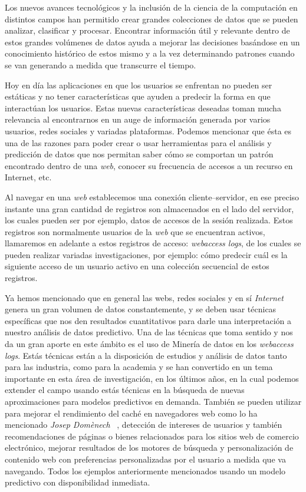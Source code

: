 {
Los nuevos avances tecnológicos y la inclusión de la ciencia de la computación en distintos campos han permitido crear grandes colecciones de datos que se pueden analizar, clasificar y procesar. Encontrar información útil y relevante dentro de estos grandes volúmenes de datos ayuda a mejorar las decisiones basándose en un conocimiento histórico de estos mismo y a la vez determinando patrones cuando se van generando a medida que transcurre el tiempo. 


Hoy en día las aplicaciones en que los usuarios se enfrentan no pueden ser estáticas y no tener características que ayuden a predecir la forma en que interactúan los usuarios. Estas nuevas características deseadas toman mucha relevancia al encontrarnos en un auge de información generada por varios usuarios, redes sociales y variadas plataformas. Podemos mencionar que ésta es una de las razones para poder  crear o usar  herramientas para el análisis y predicción de datos que nos permitan saber cómo se comportan un patrón encontrado dentro de una \emph{web}, conocer su frecuencia de accesos a un recurso en Internet, etc.

Al navegar en una \emph{web} establecemos una conexión {cliente--servidor}, en ese preciso instante una gran cantidad de registros son almacenados en el lado del servidor, los cuales pueden ser por ejemplo, datos de accesos de la sesión realizada. Estos registros  son normalmente usuarios de la \emph{web}  que se encuentran activos, llamaremos en adelante a estos registros de acceso: \emph{webaccess logs},  de los cuales se pueden realizar variadas investigaciones, por ejemplo:  cómo predecir cuál es la siguiente acceso de un usuario activo en una colección secuencial de estos registros. 

Ya hemos mencionado  que  en general las webs, redes sociales y en sí \emph{Internet} genera un gran volumen de datos constantemente, y se deben usar técnicas específicas que nos den resultados cuantitativos para darle una interpretación a nuestro análisis de datos predictivo. Una de las técnicas que toma sentido y nos da un gran aporte en este ámbito es el uso de Minería de datos  en los \emph{webaccess logs}.  Estás técnicas están a la disposición  de estudios y análisis de datos tanto para las industria, como para la academia y  se han convertido en un tema importante en esta área  de investigación, en los últimos años, en la cual podemos extender el campo usando estás técnicas en la búsqueda de nuevas aproximaciones para modelos predictivos en demanda. También se pueden utilizar para mejorar el rendimiento del caché en navegadores web como lo ha mencionado \emph{Josep Domènech} \etal~\cite{Domenech2006},  detección de intereses de usuarios y también recomendaciones de páginas o bienes relacionados para los sitios {web} de comercio electrónico, mejorar  resultados de los motores de búsqueda y personalización de contenido web con preferencias personalizadas por el usuario a medida que va navegando. Todos los ejemplos anteriormente mencionados usando un modelo predictivo con disponibilidad inmediata.



}
